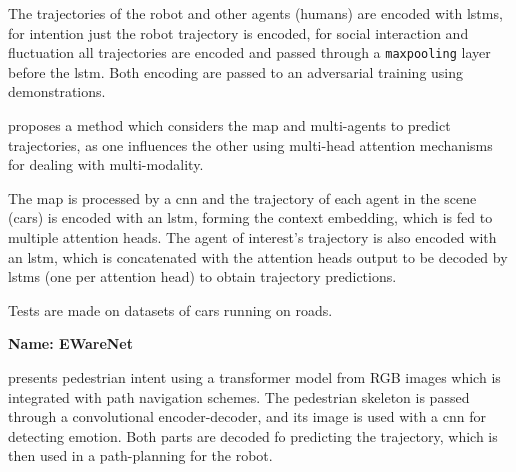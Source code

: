 The trajectories of the robot and other agents (humans) are encoded with \glspl{lstm}, for intention just the robot trajectory is encoded, for social interaction and fluctuation all trajectories are encoded and passed through a \texttt{maxpooling} layer before the \gls{lstm}.
%
Both encoding are passed to an adversarial training using demonstrations.



\cite{cui2021learning}


\cite{kiss2021probabilistic}


\cite{xu2021tra2tra}


\cite{messaoud2021trajectory} proposes a method which considers the map and multi-agents to predict trajectories, as one influences the other using multi-head attention mechanisms for dealing with multi-modality.

The map is processed by a \gls{cnn} and the trajectory of each agent in the scene (cars) is encoded with an \gls{lstm}, forming the context embedding, which is fed to multiple attention heads.
%
The agent of interest's trajectory is also encoded with an \gls{lstm}, which is concatenated with the attention heads output to be decoded by \glspl{lstm} (one per attention head) to obtain trajectory predictions.

Tests are made on datasets of cars running on roads.


\textbf{Name: EWareNet}

\cite{narayanan2023ewarenet} presents pedestrian intent using a transformer model from RGB images which is integrated with path navigation schemes.
%
The pedestrian skeleton is passed through a convolutional encoder-decoder, and its image is used with a \gls{cnn} for detecting emotion. 
%
Both parts are decoded fo predicting the trajectory, which is then used in a path-planning for the robot.

